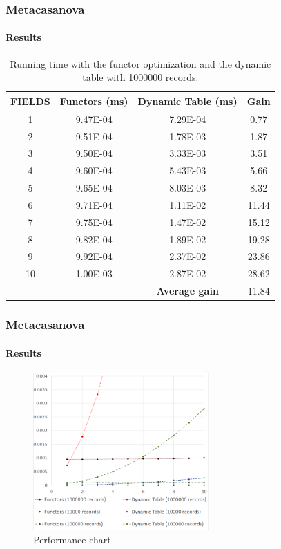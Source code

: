 \documentclass[10pt,a4paper]{beamer}
\begin{document}
\begin{frame}
\frametitle{Metacasanova}
\framesubtitle{Results}
\begin{table}
	\centering
	\tiny
	\caption{Running time with the functor optimization and the dynamic table with 1000000 records.}
	\begin{tabular}{|c|c|c|c|}
		\hline
		\textbf{FIELDS}& \textbf{Functors (ms)}&\textbf{Dynamic Table (ms)} & \textbf{Gain}\\ \hline
		1&	9.47E-04&	7.29E-04&	0.77\\ \hline
		2&	9.51E-04&	1.78E-03&	1.87\\ \hline
		3&	9.50E-04&	3.33E-03&	3.51\\ \hline
		4&	9.60E-04&	5.43E-03&	5.66\\ \hline
		5&	9.65E-04&	8.03E-03&	8.32\\ \hline
		6&	9.71E-04&	1.11E-02&	11.44\\ \hline
		7&	9.75E-04&	1.47E-02&	15.12\\ \hline
		8&	9.82E-04&	1.89E-02&	19.28\\ \hline
		9&	9.92E-04&	2.37E-02&	23.86\\ \hline
		10&	1.00E-03&	2.87E-02&	28.62\\ \hline
		\multicolumn{2}{c|}{} & \textbf{Average gain} & 11.84\\ \cline{3-4}						
	\end{tabular}
\end{table}
\end{frame}

\begin{frame}
\frametitle{Metacasanova}
\framesubtitle{Results}
\begin{figure}
	\centering
	\caption{Performance chart}
	\includegraphics[width = 0.6\textwidth]{Figures/chart}
\end{figure}
\end{frame}
\end{document}
